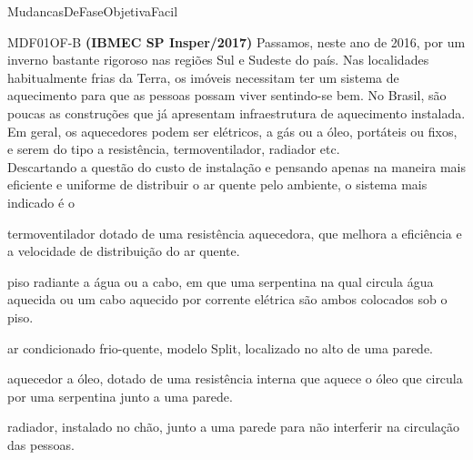\documentclass[12pt]{article}
\begin{document}
	\begin{quiz}{MudancasDeFaseObjetivaFacil}
		\begin{multi}[points=1]{MDF01OF-B}
			\textbf{(IBMEC SP Insper/2017)} Passamos, neste ano de 2016, por um inverno bastante rigoroso nas regiões Sul e Sudeste do país. Nas localidades habitualmente frias da Terra, os imóveis necessitam ter um sistema de aquecimento para que as pessoas possam viver sentindo-se bem. No Brasil, são poucas as construções que já apresentam infraestrutura de aquecimento instalada. Em geral, os aquecedores podem ser elétricos, a gás ou a óleo, portáteis ou fixos, e serem do tipo a resistência, termoventilador, radiador etc.\\			
			Descartando a questão do custo de instalação e pensando apenas na maneira mais eficiente e uniforme de distribuir o ar quente pelo ambiente, o sistema mais indicado é o			
			\item termoventilador dotado de uma resistência aquecedora, que melhora a eficiência e a velocidade de distribuição do ar quente.
			\item* piso radiante a água ou a cabo, em que uma serpentina na qual circula água aquecida ou um cabo aquecido por corrente elétrica são ambos colocados sob o piso.
			\item ar condicionado frio-quente, modelo Split, localizado no alto de uma parede.
			\item aquecedor a óleo, dotado de uma resistência interna que aquece o óleo que circula por uma serpentina junto a uma parede.
			\item radiador, instalado no chão, junto a uma parede para não interferir na circulação das pessoas.
		\end{multi}
	

\end{quiz}
\end{document}
